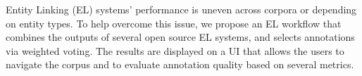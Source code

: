 Entity Linking (EL) systems' performance is uneven across corpora or depending on entity types. To help overcome this issue, we propose an EL workflow that combines the outputs of several open source EL systems, and selects annotations via weighted voting. The results are displayed on a UI that allows the users to navigate the corpus and to evaluate annotation quality based on several metrics.
